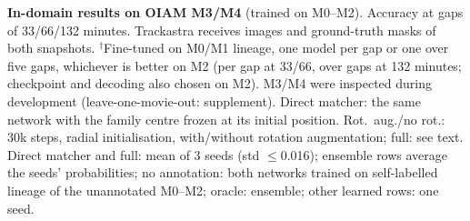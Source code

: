 \begin{table}[t]
\caption{\textbf{In-domain results on OIAM M3/M4} (trained on M0--M2). Accuracy at gaps of 33/66/132 minutes. Trackastra receives images and ground-truth masks of both snapshots. $^\dagger$Fine-tuned on M0/M1 lineage, one model per gap or one over five gaps, whichever is better on M2 (per gap at 33/66, over gaps at 132 minutes; checkpoint and decoding also chosen on M2). M3/M4 were inspected during development (leave-one-movie-out: supplement). Direct matcher: the same network with the family centre frozen at its initial position. Rot.\ aug./no rot.: 30k steps, radial initialisation, with/without rotation augmentation; full: see text. Direct matcher and full: mean of 3 seeds (std $\le$0.016); ensemble rows average the seeds' probabilities; no annotation: both networks trained on self-labelled lineage of the unannotated M0--M2; oracle: ensemble; other learned rows: one seed.}
\label{tab:oiam}
\end{table}

